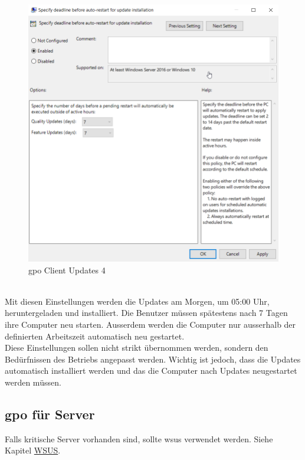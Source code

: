 \begin{minipage}{0.5\linewidth}
    \begin{figure}[H]
        \centering
        \includegraphics[width=\linewidth]{../img/Updates/client-force-restart-deadline.png}
        \caption{\acrshort{gpo} Client Updates 4}
    \end{figure}
\end{minipage}\\

Mit diesen Einstellungen werden die Updates am Morgen, um 05:00 Uhr,  heruntergeladen und installiert.
Die Benutzer müssen spätestens nach 7 Tagen ihre Computer neu starten.
Ausserdem werden die Computer nur ausserhalb der definierten Arbeitszeit automatisch neu gestartet.\\

Diese Einstellungen sollen nicht strikt übernommen werden, sondern den Bedürfnissen des Betriebs angepasst werden.
Wichtig ist jedoch, dass die Updates automatisch installiert werden und das die Computer nach Updates neugestartet werden müssen.

\subsection{\acrshort{gpo} für Server}
Falls kritische Server vorhanden sind, sollte \acrfull{wsus} verwendet werden. Siehe Kapitel \hyperref[subsec:wsus]{WSUS}.\\

